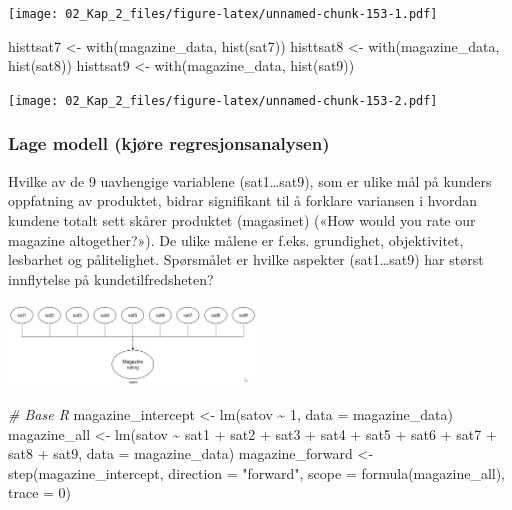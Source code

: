 \documentclass[
]{article}
\newenvironment{Shaded}{\begin{snugshade}}{\end{snugshade}}
\newcommand{\AttributeTok}[1]{\textcolor[rgb]{0.77,0.63,0.00}{#1}}
\newcommand{\CommentTok}[1]{\textcolor[rgb]{0.56,0.35,0.01}{\textit{#1}}}
\newcommand{\DecValTok}[1]{\textcolor[rgb]{0.00,0.00,0.81}{#1}}
\newcommand{\FunctionTok}[1]{\textcolor[rgb]{0.00,0.00,0.00}{#1}}
\newcommand{\NormalTok}[1]{#1}
\newcommand{\OtherTok}[1]{\textcolor[rgb]{0.56,0.35,0.01}{#1}}
\newcommand{\SpecialCharTok}[1]{\textcolor[rgb]{0.00,0.00,0.00}{#1}}
\newcommand{\StringTok}[1]{\textcolor[rgb]{0.31,0.60,0.02}{#1}}
\begin{document}
\texttt{[image: 02\_Kap\_2\_files/figure-latex/unnamed-chunk-153-1.pdf]}

\begin{Shaded}
\begin{Highlighting}[]
\NormalTok{histtsat7 }\OtherTok{\textless{}{-}} \FunctionTok{with}\NormalTok{(magazine\_data, }\FunctionTok{hist}\NormalTok{(sat7))}
\NormalTok{histtsat8 }\OtherTok{\textless{}{-}} \FunctionTok{with}\NormalTok{(magazine\_data, }\FunctionTok{hist}\NormalTok{(sat8))}
\NormalTok{histtsat9 }\OtherTok{\textless{}{-}} \FunctionTok{with}\NormalTok{(magazine\_data, }\FunctionTok{hist}\NormalTok{(sat9))}
\end{Highlighting}
\end{Shaded}

\texttt{[image: 02\_Kap\_2\_files/figure-latex/unnamed-chunk-153-2.pdf]}

\hypertarget{lage-modell-kjuxf8re-regresjonsanalysen-2}{%
\subsubsection{Lage modell (kjøre regresjonsanalysen)}\label{lage-modell-kjuxf8re-regresjonsanalysen-2}}

Hvilke av de 9 uavhengige variablene (sat1\ldots sat9), som er ulike mål på kunders oppfatning av produktet, bidrar signifikant til å forklare variansen i hvordan kundene totalt sett skårer produktet (magasinet) («How would you rate our magazine altogether?»). De ulike målene er f.eks. grundighet, objektivitet, lesbarhet og pålitelighet. Spørsmålet er hvilke aspekter (sat1\ldots sat9) har størst innflytelse på kundetilfredsheten?

\includegraphics[width=0.5\textwidth,height=\textheight]{stepwise.png}

\begin{Shaded}
\begin{Highlighting}[]
\CommentTok{\# Base R}
\NormalTok{magazine\_intercept }\OtherTok{\textless{}{-}} \FunctionTok{lm}\NormalTok{(satov }\SpecialCharTok{\textasciitilde{}} \DecValTok{1}\NormalTok{, }\AttributeTok{data =}\NormalTok{ magazine\_data)}
\NormalTok{magazine\_all }\OtherTok{\textless{}{-}} \FunctionTok{lm}\NormalTok{(satov }\SpecialCharTok{\textasciitilde{}}\NormalTok{ sat1 }\SpecialCharTok{+}\NormalTok{ sat2 }\SpecialCharTok{+}\NormalTok{ sat3 }\SpecialCharTok{+}\NormalTok{ sat4 }\SpecialCharTok{+}\NormalTok{ sat5 }\SpecialCharTok{+}\NormalTok{ sat6 }\SpecialCharTok{+}\NormalTok{ sat7 }\SpecialCharTok{+}\NormalTok{ sat8 }\SpecialCharTok{+}\NormalTok{ sat9, }\AttributeTok{data =}\NormalTok{ magazine\_data)}
\NormalTok{magazine\_forward }\OtherTok{\textless{}{-}} \FunctionTok{step}\NormalTok{(magazine\_intercept, }\AttributeTok{direction =} \StringTok{"forward"}\NormalTok{, }\AttributeTok{scope =} \FunctionTok{formula}\NormalTok{(magazine\_all), }\AttributeTok{trace =} \DecValTok{0}\NormalTok{)}
\end{Highlighting}
\end{Shaded}
\end{document}
